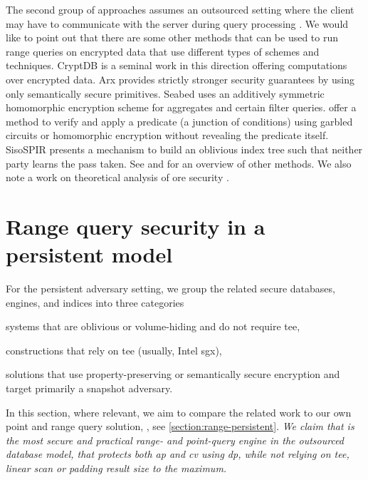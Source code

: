 		The second group of approaches assumes an outsourced setting where the client may have to communicate with the server during query processing \cite{pope, florian-protocol, secure-queries-overview, practical-range-search}.
		We would like to point out that there are some other methods that can be used to run range queries on encrypted data that use different types of schemes and techniques.
		CryptDB \cite{crypt-db} is a seminal work in this direction offering computations over encrypted data.
		Arx \cite{arx} provides strictly stronger security guarantees by using only semantically secure primitives.
		Seabed \cite{seabed} uses an additively symmetric homomorphic encryption scheme for aggregates and certain filter queries.
		\textcite{ppqed} offer a method to verify and apply a predicate (a junction of conditions) using garbled circuits or homomorphic encryption without revealing the predicate itself.
		SisoSPIR \cite{sisospir} presents a mechanism to build an oblivious index tree such that neither party learns the pass taken.
		See \cite{secure-queries-overview} and \cite{protocols-survey} for an overview of other methods. %
		We also note a work on theoretical analysis of \acrshort{ore} security \cite{ore-theory-security}.

	\section{Range query security in a persistent model}

		For the persistent adversary setting, we group the related secure databases, engines, and indices into three categories
		\begin{enumerate*}[label={(\roman*)}]
			\item systems that are oblivious or volume-hiding and do not require \acrfull{tee},
			\item constructions that rely on \acrshort{tee} (usually, Intel \acrshort{sgx}),
			\item solutions that use property-preserving or semantically secure encryption and target primarily a snapshot adversary.
		\end{enumerate*}
		In this section, where relevant, we aim to compare the related work to our own point and range query solution, \epsolute{} \cite{epsolute}, see \cref{section:range-persistent}.
		\emph{We claim that \epsolute{} is the most secure and practical range- and point-query engine in the outsourced database model, that protects both \acrfull{ap} and \acrfull{cv} using \acrlong{dp}, while not relying on \acrshort{tee}, linear scan or padding result size to the maximum.}

